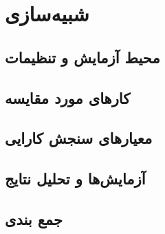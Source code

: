 \chapter{شبیه‌سازی}
\label{chap:simulation}

\section{محیط آزمایش و تنظیمات}

\section{کارهای مورد مقایسه}

\section{معیارهای سنجش کارایی}

\section{آزمایش‌ها و تحلیل نتایج}

\section{جمع بندی}


